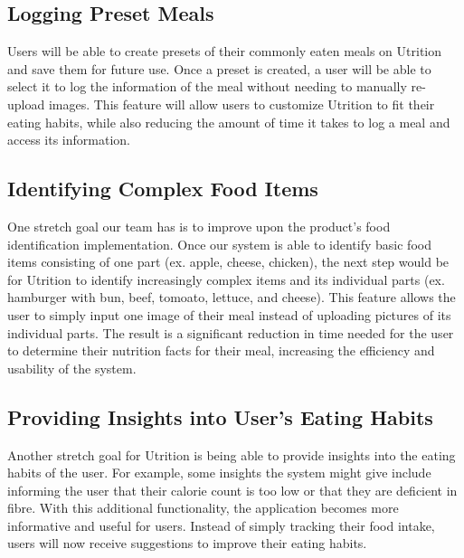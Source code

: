 \documentclass{article}
\begin{document}
\subsection{Logging Preset Meals}

Users will be able to create presets of their commonly eaten meals on Utrition 
and save them for future use. Once a preset is created, a user will be able to 
select it to log the information of the meal without needing to manually 
re-upload images. This feature will allow users to customize Utrition to fit 
their eating habits, while also reducing the amount of time it takes to log a 
meal and access its information.

\subsection{Identifying Complex Food Items}

One stretch goal our team has is to improve upon the product's food identification implementation. Once our system is able to identify basic food items consisting of one part (ex. apple, cheese, chicken), the next step would be for Utrition to identify increasingly complex items and its individual parts (ex. hamburger with bun, beef, tomoato, lettuce, and cheese). This feature allows the user to simply input one image of their meal instead of uploading pictures of its individual parts. The result is a significant reduction in time needed for the user to determine their nutrition facts for their meal, increasing the efficiency and usability of the system.

\subsection{Providing Insights into User's Eating Habits}

Another stretch goal for Utrition is being able to provide insights into the eating habits of the user. For example, some insights the system might give include informing the user that their calorie count is too low or that they are deficient in fibre. With this additional functionality, the application becomes more informative and useful for users. Instead of simply tracking their food intake, users will now receive suggestions to improve their eating habits.
\end{document}
